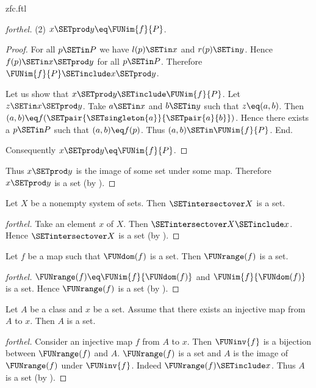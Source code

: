 \documentclass{naproche-library}
\begin{document}
\begin{smodule}[title=ZFC]{zfc.ftl}
\begin{proof}[forthel]
  (2) $x \SETprod y \eq \FUNim{f}{P}$.
  \begin{proof}
    For all $p \SETin P$ we have $l(p) \SETin x$ and $r(p) \SETin y$.
    Hence $f(p) \SETin x \SETprod y$ for all $p \SETin P$.
    Therefore $\FUNim{f}{P} \SETinclude x \SETprod y$.

    Let us show that $x \SETprod y \SETinclude \FUNim{f}{P}$.
      Let $z \SETin x \SETprod y$.
      Take $a \SETin x$ and $b \SETin y$ such that $z \eq (a,b)$.
      Then $(a,b) \eq f(\SETpair{\SETsingleton{a}}{\SETpair{a}{b}})$.
      Hence there exists a $p \SETin P$ such that $(a,b) \eq f(p)$.
      Thus $(a,b) \SETin \FUNim{f}{P}$.
    End.

    Consequently $x \SETprod y \eq \FUNim{f}{P}$.
  \end{proof}

  Thus $x \SETprod y$ is the image of some set under some map.
  Therefore $x \SETprod y$ is a set (by ).
\end{proof}

\begin{proposition}[forthel,id=FOUNDATIONS_10_5486815207227392]
  Let $X$ be a nonempty system of sets.
  Then $\SETintersectover X$ is a set.
\end{proposition}
\begin{proof}[forthel]
  Take an element $x$ of $X$.
  Then $\SETintersectover X \SETinclude x$.
  Hence $\SETintersectover X$ is a set (by ).
\end{proof}

\begin{proposition}[forthel,id=FOUNDATIONS_10_7598384349184000]
  Let $f$ be a map such that $\FUNdom(f)$ is a set.
  Then $\FUNrange(f)$ is a set.
\end{proposition}
\begin{proof}[forthel]
  $\FUNrange(f) \eq \FUNim{f}{\FUNdom(f)}$ and $\FUNim{f}{\FUNdom(f)}$ is a set.
  Hence $\FUNrange(f)$ is a set (by ).
\end{proof}

\begin{proposition}[forthel,id=FOUNDATIONS_10_8631339572002816]
  Let $A$ be a class and $x$ be a set.
  Assume that there exists an injective map from $A$ to $x$.
  Then $A$ is a set.
\end{proposition}
\begin{proof}[forthel]
  Consider an injective map $f$ from $A$ to $x$.
  Then $\FUNinv{f}$ is a bijection between $\FUNrange(f)$ and $A$.
  $\FUNrange(f)$ is a set and $A$ is the image of $\FUNrange(f)$ under $\FUNinv{f}$.
  Indeed $\FUNrange(f) \SETinclude x$.
  Thus $A$ is a set (by ).
\end{proof}


\end{smodule}
\end{document}
